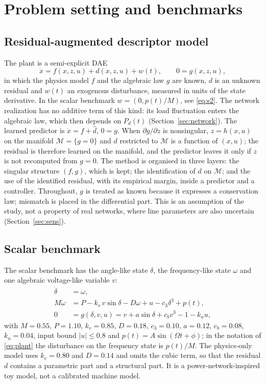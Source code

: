 \documentclass[preprint,12pt]{elsarticle}
\begin{document}
\section{Problem setting and benchmarks}
\label{sec:setting}
\subsection{Residual-augmented descriptor model}
The plant is a semi-explicit DAE
\begin{equation}
\dot x = f(x,z,u) + d(x,z,u) + w(t),\qquad 0=g(x,z,u),
\label{eq:plant}
\end{equation}
in which the physics model $f$ and the algebraic law $g$ are known, $d$ is an unknown residual and $w(t)$ an exogenous disturbance, measured in units of the state derivative. In the scalar benchmark $w=(0,p(t)/M)$, see \eqref{eq:s2}. The network realization has no additive term of this kind: its load fluctuation enters the algebraic law, which then depends on $P_d(t)$ (Section~\ref{sec:network}). The learned predictor is $\dot x=f+\hat d$, $0=g$. When $\partial g/\partial z$ is nonsingular, $z=h(x,u)$ on the manifold $\mathcal M=\{g=0\}$ and $d$ restricted to $\mathcal M$ is a function of $(x,u)$; the residual is therefore learned on the manifold, and the predictor leaves it only if $z$ is not recomputed from $g=0$. The method is organised in three layers: the singular structure $(f,g)$, which is kept; the identification of $d$ on $\mathcal M$; and the use of the identified residual, with its empirical margin, inside a predictor and a controller. Throughout, $g$ is treated as known because it expresses a conservation law; mismatch is placed in the differential part. This is an assumption of the study, not a property of real networks, where line parameters are also uncertain (Section~\ref{sec:sens}).

\subsection{Scalar benchmark}
\label{sec:scalar}
The scalar benchmark has the angle-like state $\delta$, the frequency-like state $\omega$ and one algebraic voltage-like variable $v$:
\begin{align}
\dot\delta &= \omega, \label{eq:s1}\\
M\dot\omega &= P - k_v\,v\sin\delta - D\omega + u - c_3\delta^3 + p(t), \label{eq:s2}\\
0 &= g(\delta,v,u) = v + a\sin\delta + c_b v^3 - 1 - k_u u, \label{eq:s3}
\end{align}
with $M=0.55$, $P=1.10$, $k_v=0.85$, $D=0.18$, $c_3=0.10$, $a=0.12$, $c_b=0.08$, $k_u=0.04$, input bound $|u|\le 0.8$ and $p(t)=A\sin(\Omega t+\phi)$; in the notation of \eqref{eq:plant} the disturbance on the frequency state is $p(t)/M$. The physics-only model uses $k_v=0.80$ and $D=0.14$ and omits the cubic term, so that the residual $d$ contains a parametric part and a structural part. It is a power-network-inspired toy model, not a calibrated machine model.
\end{document}
